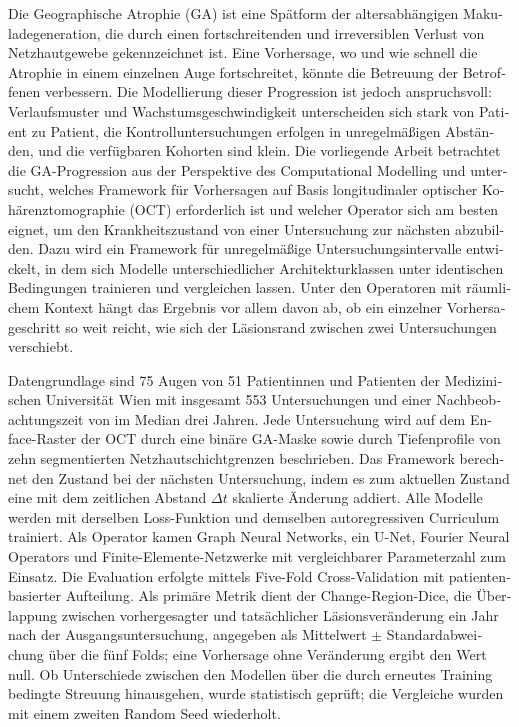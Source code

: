 \cleardoubleoddpage%
\begin{otherlanguage}{ngerman}
\begin{abstract*}
Die Geographische Atrophie (GA) ist eine Spätform der altersabhängigen
Makuladegeneration, die durch einen fortschreitenden und irreversiblen
Verlust von Netzhautgewebe gekennzeichnet ist. Eine Vorhersage, wo und wie
schnell die Atrophie in einem einzelnen Auge fortschreitet, könnte die
Betreuung der Betroffenen verbessern. Die Modellierung dieser Progression ist
jedoch anspruchsvoll: Verlaufsmuster und Wachstumsgeschwindigkeit
unterscheiden sich stark von Patient zu Patient, die Kontrolluntersuchungen
erfolgen in unregelmäßigen Abständen, und die verfügbaren Kohorten sind
klein. Die vorliegende Arbeit betrachtet die GA-Progression aus der
Perspektive des Computational Modelling und untersucht, welches Framework
für Vorhersagen auf Basis longitudinaler optischer Kohärenztomographie (OCT)
erforderlich ist und welcher Operator sich am besten eignet, um den
Krankheitszustand von einer Untersuchung zur nächsten abzubilden. Dazu wird
ein Framework für unregelmäßige Untersuchungsintervalle entwickelt, in dem
sich Modelle unterschiedlicher Architekturklassen unter identischen
Bedingungen trainieren und vergleichen lassen. Unter den Operatoren mit räumlichem Kontext
hängt das Ergebnis vor allem davon ab, ob ein einzelner Vorhersageschritt so
weit reicht, wie sich der Läsionsrand zwischen zwei Untersuchungen
verschiebt.

Datengrundlage sind 75 Augen von 51 Patientinnen und Patienten der
Medizinischen Universität Wien mit insgesamt 553 Untersuchungen und einer
Nachbeobachtungszeit von im Median drei Jahren. Jede Untersuchung wird auf
dem En-face-Raster der OCT durch eine binäre GA-Maske sowie durch
Tiefenprofile von zehn segmentierten
Netzhautschichtgrenzen beschrieben. Das Framework berechnet den Zustand bei
der nächsten Untersuchung, indem es zum aktuellen Zustand eine mit dem
zeitlichen Abstand $\Delta t$ skalierte Änderung addiert. Alle Modelle werden
mit derselben Loss-Funktion und demselben autoregressiven Curriculum
trainiert. Als
Operator kamen Graph Neural Networks, ein U-Net, Fourier Neural Operators und
Finite-Elemente-Netzwerke mit vergleichbarer Parameterzahl zum Einsatz. Die
Evaluation erfolgte mittels Five-Fold Cross-Validation mit patientenbasierter
Aufteilung. Als primäre Metrik dient der Change-Region-Dice, die Überlappung
zwischen vorhergesagter und tatsächlicher Läsionsveränderung ein Jahr nach
der Ausgangsuntersuchung, angegeben als Mittelwert $\pm$ Standardabweichung
über die fünf Folds; eine Vorhersage ohne Veränderung ergibt den Wert null.
Ob Unterschiede zwischen den Modellen über die durch erneutes Training
bedingte Streuung hinausgehen, wurde statistisch geprüft; die Vergleiche
wurden mit einem zweiten Random Seed wiederholt.


\end{abstract*}
\end{otherlanguage}

